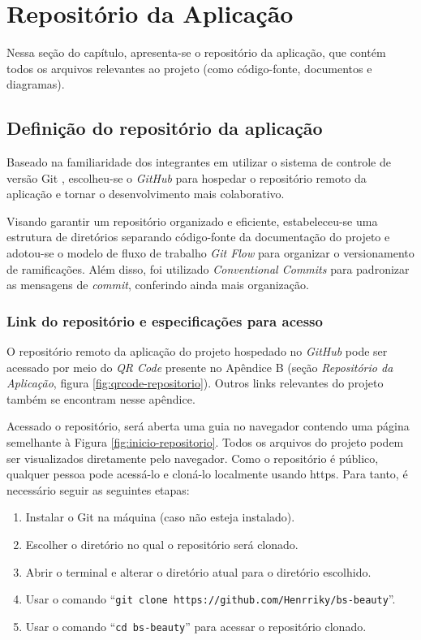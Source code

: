\section{Repositório da Aplicação}

\label{section:repositorio-aplicacao}

Nessa seção do capítulo, apresenta-se o repositório da aplicação, que contém todos os arquivos relevantes ao projeto (como código-fonte, documentos e diagramas).

\subsection{Definição do repositório da aplicação}

Baseado na familiaridade dos integrantes em utilizar o sistema de controle de versão Git \cite{git-2025}, escolheu-se o \emph{GitHub} \cite{github-2025} para hospedar o repositório remoto da aplicação e tornar o desenvolvimento mais colaborativo.

Visando garantir um repositório organizado e eficiente, estabeleceu-se uma estrutura de diretórios separando código-fonte da documentação do projeto e adotou-se o modelo de fluxo de trabalho \textit{Git Flow} \cite{gitflow-2023} para organizar o versionamento de ramificações. Além disso, foi utilizado \textit{Conventional Commits} \cite{convcommits-2025} para padronizar as mensagens de \textit{commit}, conferindo ainda mais organização.

\subsubsection{Link do repositório e especificações para acesso}

O repositório remoto da aplicação do projeto hospedado no \emph{GitHub} pode ser acessado por meio do \emph{QR Code} presente no Apêndice B (seção \emph{Repositório da Aplicação}, figura \ref{fig:qrcode-repositorio}). Outros links relevantes do projeto também se encontram nesse apêndice.

Acessado o repositório, será aberta uma guia no navegador contendo uma página semelhante à Figura \ref{fig:inicio-repositorio}. Todos os arquivos do projeto podem ser visualizados diretamente pelo navegador. Como o repositório é público, qualquer pessoa pode acessá-lo e cloná-lo localmente usando \gls{https}. Para tanto, é necessário seguir as seguintes etapas:
 
\begin{enumerate}
	\item Instalar o Git na máquina (caso não esteja instalado).
	\item Escolher o diretório no qual o repositório será clonado.
	\item Abrir o terminal e alterar o diretório atual para o diretório escolhido.
	\item Usar o comando ``\texttt{git clone https://github.com/Henrriky/bs-beauty}''.
	\item Usar o comando ``\texttt{cd bs-beauty}'' para acessar o repositório clonado.
\end{enumerate}

